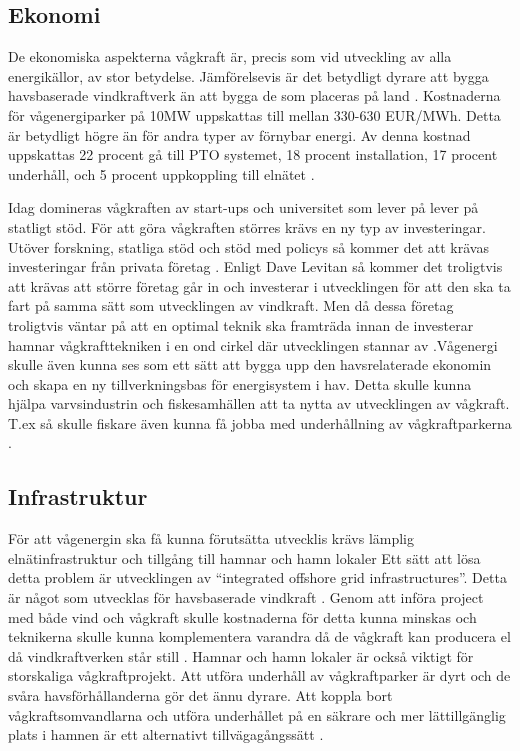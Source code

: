 \documentclass[10pt,a4paper,oneside]{article}
\begin{document}
\subsection{Ekonomi}
De ekonomiska aspekterna vågkraft är, precis som vid utveckling av alla energikällor, av stor betydelse. Jämförelsevis är det betydligt dyrare att bygga havsbaserade vindkraftverk än att bygga de som placeras på land \cite{Yale}. 
Kostnaderna för vågenergiparker på 10MW uppskattas till mellan 330-630 EUR/MWh. Detta är betydligt högre än för andra typer av förnybar energi. Av denna kostnad uppskattas 22 procent gå till PTO systemet, 18 procent installation, 17 procent underhåll, och 5 procent uppkoppling till elnätet \cite{IRENA}.

Idag domineras vågkraften av start-ups och universitet som lever på lever på statligt stöd. För att göra vågkraften störres krävs en ny typ av investeringar. Utöver forskning, statliga stöd och stöd med policys så kommer det att krävas investeringar från privata företag \cite{IRENA}. Enligt Dave Levitan så kommer det troligtvis att krävas att större företag går in och investerar i utvecklingen för att den ska ta fart på samma sätt som utvecklingen av vindkraft. Men då dessa företag troligtvis väntar på att en optimal teknik ska framträda innan de investerar hamnar vågkrafttekniken i en ond cirkel där utvecklingen stannar av \cite{Yale}.Vågenergi skulle även kunna ses som ett sätt att bygga upp den havsrelaterade ekonomin och skapa en ny tillverkningsbas för energisystem i hav. Detta skulle kunna hjälpa varvsindustrin och fiskesamhällen att ta nytta av utvecklingen av vågkraft. T.ex så skulle fiskare även kunna få jobba med underhållning av vågkraftparkerna \cite{IRENA}. 

\subsection{Infrastruktur}
För att vågenergin ska få kunna förutsätta utvecklis krävs lämplig elnätinfrastruktur och tillgång till hamnar och hamn lokaler Ett sätt att lösa detta problem är utvecklingen av “integrated offshore grid infrastructures”. Detta är något som utvecklas för havsbaserade vindkraft \cite{IRENA}. Genom att införa project med både vind och vågkraft skulle kostnaderna för detta kunna minskas och teknikerna skulle kunna komplementera varandra då de vågkraft kan producera el då vindkraftverken står still \cite{Yale}. Hamnar och hamn lokaler är också viktigt för storskaliga vågkraftprojekt. Att utföra underhåll av vågkraftparker är dyrt och de svåra havsförhållanderna gör det ännu dyrare. Att koppla bort vågkraftsomvandlarna och utföra underhållet på en säkrare och mer lättillgänglig plats i hamnen är ett alternativt tillvägagångssätt \cite{IRENA}. 
\end{document}
